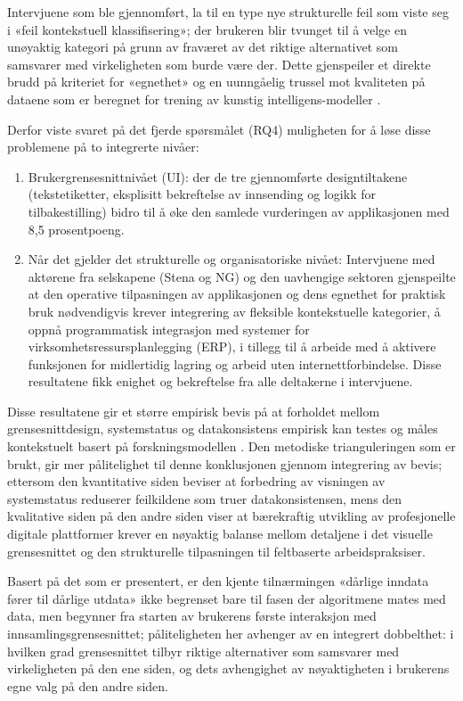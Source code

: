 Intervjuene som ble gjennomført, la til en type nye strukturelle feil som viste seg i «feil kontekstuell klassifisering»; der brukeren blir tvunget til å velge en unøyaktig kategori på grunn av fraværet av det riktige alternativet som samsvarer med virkeligheten som burde være der. Dette gjenspeiler et direkte brudd på kriteriet for «egnethet» \cite{weichbroth2024} og en uunngåelig trussel mot kvaliteten på dataene som er beregnet for trening av kunstig intelligens-modeller \cite{heck2025, geiger2021}.

Derfor viste svaret på det fjerde spørsmålet (RQ4) muligheten for å løse disse problemene på to integrerte nivåer:

\begin{enumerate}
    \item Brukergrensesnittnivået (UI): der de tre gjennomførte designtiltakene (tekstetiketter, eksplisitt bekreftelse av innsending og logikk for tilbakestilling) bidro til å øke den samlede vurderingen av applikasjonen med 8,5 prosentpoeng.

    \item Når det gjelder det strukturelle og organisatoriske nivået: Intervjuene med aktørene fra selskapene (Stena og NG) og den uavhengige sektoren gjenspeilte at den operative tilpasningen av applikasjonen og dens egnethet for praktisk bruk nødvendigvis krever integrering av fleksible kontekstuelle kategorier, å oppnå programmatisk integrasjon med systemer for virksomhetsressursplanlegging (ERP), i tillegg til å arbeide med å aktivere funksjonen for midlertidig lagring og arbeid uten internettforbindelse. Disse resultatene fikk enighet og bekreftelse fra alle deltakerne i intervjuene.
\end{enumerate}

Disse resultatene gir et større empirisk bevis på at forholdet mellom grensesnittdesign, systemstatus og datakonsistens empirisk kan testes og måles kontekstuelt basert på forskningsmodellen \cite{nielsen1994,norman2013,wang1996}. Den metodiske trianguleringen som er brukt, gir mer pålitelighet til denne konklusjonen gjennom integrering av bevis; ettersom den kvantitative siden beviser at forbedring av visningen av systemstatus reduserer feilkildene som truer datakonsistensen, mens den kvalitative siden på den andre siden viser at bærekraftig utvikling av profesjonelle digitale plattformer krever en nøyaktig balanse mellom detaljene i det visuelle grensesnittet og den strukturelle tilpasningen til feltbaserte arbeidspraksiser.

Basert på det som er presentert, er den kjente tilnærmingen «dårlige inndata fører til dårlige utdata»  \cite{heck2025, geiger2021} ikke begrenset bare til fasen der algoritmene mates med data, men begynner fra starten av brukerens første interaksjon med innsamlingsgrensesnittet; påliteligheten her avhenger av en integrert dobbelthet: i hvilken grad grensesnittet tilbyr riktige alternativer som samsvarer med virkeligheten på den ene siden, og dets avhengighet av nøyaktigheten i brukerens egne valg på den andre siden.

